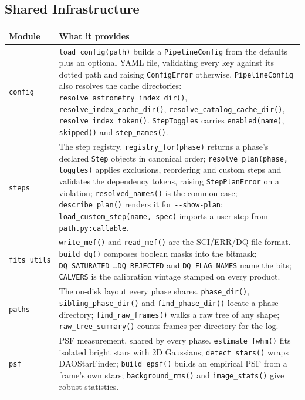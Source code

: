 \documentclass[11pt,a4paper]{article}
\begin{document}
\subsection{Shared Infrastructure}
\begin{center}
\begin{longtable}{|p{3.6cm}|p{10.9cm}|}
\hline
\textbf{Module} & \textbf{What it provides} \\
\hline
\endhead
\texttt{config} & \texttt{load\_config(path)} builds a \texttt{PipelineConfig} from the defaults plus an optional YAML file, validating every key against its dotted path and raising \texttt{ConfigError} otherwise. \texttt{PipelineConfig} also resolves the cache directories: \texttt{resolve\_astrometry\_index\_dir()}, \texttt{resolve\_index\_cache\_dir()}, \texttt{resolve\_catalog\_cache\_dir()}, \texttt{resolve\_index\_token()}. \texttt{StepToggles} carries \texttt{enabled(name)}, \texttt{skipped()} and \texttt{step\_names()}. \\
\hline
\texttt{steps} & The step registry. \texttt{registry\_for(phase)} returns a phase's declared \texttt{Step} objects in canonical order; \texttt{resolve\_plan(phase, toggles)} applies exclusions, reordering and custom steps and validates the dependency tokens, raising \texttt{StepPlanError} on a violation; \texttt{resolved\_names()} is the common case; \texttt{describe\_plan()} renders it for \texttt{-{}-show-plan}; \texttt{load\_custom\_step(name, spec)} imports a user step from \texttt{path.py:callable}. \\
\hline
\texttt{fits\_utils} & \texttt{write\_mef()} and \texttt{read\_mef()} are the SCI/ERR/DQ file format. \texttt{build\_dq()} composes boolean masks into the bitmask; \texttt{DQ\_SATURATED} \ldots \texttt{DQ\_REJECTED} and \texttt{DQ\_FLAG\_NAMES} name the bits; \texttt{CALVERS} is the calibration vintage stamped on every product. \\
\hline
\texttt{paths} & The on-disk layout every phase shares. \texttt{phase\_dir()}, \texttt{sibling\_phase\_dir()} and \texttt{find\_phase\_dir()} locate a phase directory; \texttt{find\_raw\_frames()} walks a raw tree of any shape; \texttt{raw\_tree\_summary()} counts frames per directory for the log. \\
\hline
\texttt{psf} & PSF measurement, shared by every phase. \texttt{estimate\_fwhm()} fits isolated bright stars with 2D Gaussians; \texttt{detect\_stars()} wraps DAOStarFinder; \texttt{build\_epsf()} builds an empirical PSF from a frame's own stars; \texttt{background\_rms()} and \texttt{image\_stats()} give robust statistics. \\

\end{longtable}
\end{center}
\end{document}
